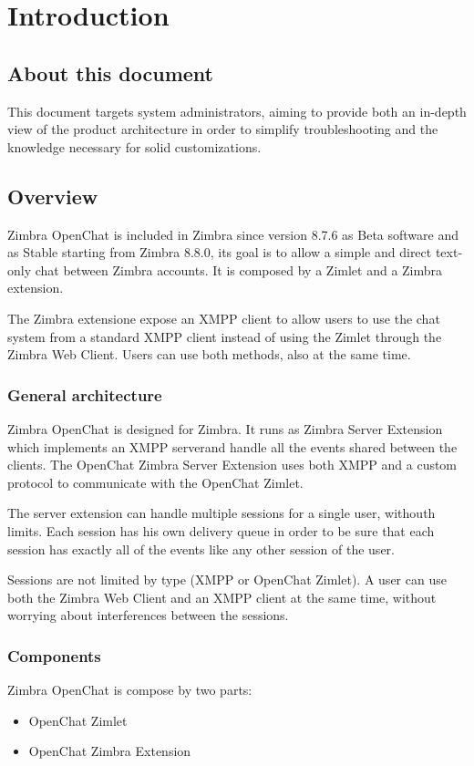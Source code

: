 \chapter{Introduction}

\section{About this document}
    This document targets system administrators, aiming to provide both an in-depth view of the product architecture in
    order to simplify troubleshooting and the knowledge necessary for solid customizations.

\section{Overview}
    Zimbra OpenChat is included in Zimbra since version 8.7.6 as Beta software and as Stable starting from Zimbra 8.8.0,
    its goal is to allow a simple and direct text-only chat between Zimbra accounts.
    It is composed by a Zimlet and a Zimbra extension.

    The Zimbra extensione expose an XMPP client to allow users to use the chat system from a standard XMPP client instead
    of using the Zimlet through the Zimbra Web Client. Users can use both methods, also at the same time.

\subsection{General architecture}
    Zimbra OpenChat is designed for Zimbra.
    It runs as Zimbra Server Extension which implements an XMPP serverand handle all the events shared between the clients.
    The OpenChat Zimbra Server Extension uses both XMPP and a custom protocol to communicate with the OpenChat Zimlet.

    The server extension can handle multiple sessions for a single user, withouth limits.
    Each session has his own delivery queue in order to be sure that each session has exactly all of the events like any
    other session of the user.

    Sessions are not limited by type (XMPP or OpenChat Zimlet).
    A user can use both the Zimbra Web Client and an XMPP client at the same time, without worrying about interferences
    between the sessions.

\subsection{Components}
    Zimbra OpenChat is compose by two parts:
    \begin{itemize}
        \item OpenChat Zimlet
        \item OpenChat Zimbra Extension
    \end{itemize}

